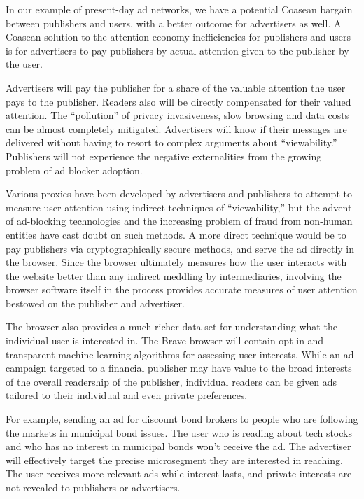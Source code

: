 \documentclass[11pt]{article}
\begin{document}
In our example of present-day ad networks, we have a potential Coasean
bargain between publishers and users, with a better outcome for
advertisers as well. A Coasean solution to the attention economy
inefficiencies for publishers and users is for advertisers to pay
publishers by actual attention given to the publisher by the user. 

Advertisers will pay the publisher for a share of the valuable
attention the user pays to the publisher. Readers also will be
directly compensated for their valued attention. The ``pollution'' of privacy invasiveness, slow browsing and data costs can be almost completely mitigated. Advertisers will know if their messages are delivered without having to resort to complex arguments about 
``viewability.'' Publishers will not experience the negative
externalities from the growing problem of ad blocker adoption. 

Various proxies have been developed by advertisers and publishers to
attempt to measure user attention using indirect techniques of
``viewability,'' but the advent of ad-blocking technologies and the
increasing problem of fraud from non-human entities have cast doubt on
such methods. A more direct technique would be to pay publishers via
cryptographically secure methods, and serve the ad directly in the
browser. Since the browser ultimately measures how the user interacts
with the website better than any indirect meddling by intermediaries,
involving the browser software itself in the process provides accurate
measures of user attention bestowed on the publisher and advertiser. 

The browser also provides a much richer data set for understanding
what the individual user is interested in. The Brave browser will
contain opt-in and transparent machine learning algorithms for
assessing user interests. While an ad campaign targeted to a financial
publisher may have value to the broad interests of the overall
readership of the publisher, individual readers can be given ads
tailored to their individual and even private preferences. 

For example, sending an ad for discount bond brokers to people who are
following the markets in municipal bond issues. The user who is
reading about tech stocks and who has no interest in municipal bonds
won't receive the ad. The advertiser will effectively target the
precise microsegment they are interested in reaching. The user receives more relevant ads while interest lasts, and private interests are not revealed to publishers or advertisers.
\end{document}
